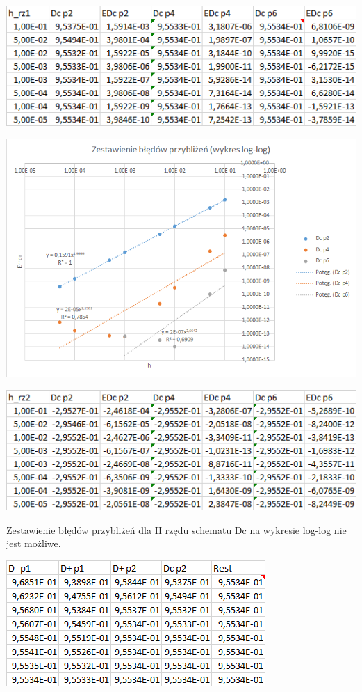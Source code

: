 \includegraphics{Lab2/charts/rz1_log_Dc_dane.png}

\includegraphics{Lab2/charts/rz1_log_Dc.png}
\newpage


\includegraphics{Lab2/charts/rz2_log_Dc_dane.png}

Zestawienie błędów przybliżeń dla II rzędu schematu Dc na wykresie log-log nie jest możliwe. 

\includegraphics{Lab2/charts/rz1_log_e_dane.png}

